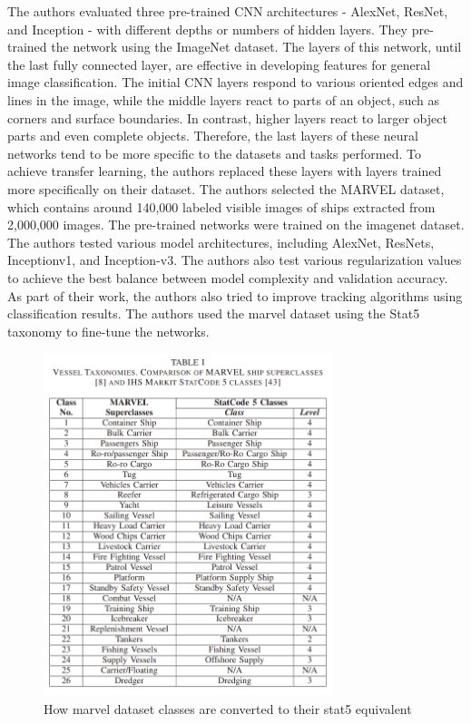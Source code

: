 The authors evaluated three pre-trained CNN architectures - AlexNet, ResNet, and Inception - with different depths or numbers of hidden layers. They pre-trained the network using the ImageNet dataset. The layers of this network, until the last fully connected layer, are effective in developing features for general image classification. The initial CNN layers respond to various oriented edges and lines in the image, while the middle layers react to parts of an object, such as corners and surface boundaries. In contrast, higher layers react to larger object parts and even complete objects. Therefore, the last layers of these neural networks tend to be more specific to the datasets and tasks performed. To achieve transfer learning, the authors replaced these layers with layers trained more specifically on their dataset. The authors selected the MARVEL dataset, which contains around 140,000 labeled visible images of ships extracted from 2,000,000 images. The pre-trained networks were trained on the imagenet dataset. The authors tested various model architectures, including AlexNet, ResNets, Inceptionv1, and Inception-v3. The authors also test various regularization values to achieve the best balance between model complexity and validation accuracy. As part of their work, the authors also tried to improve tracking algorithms using classification results. The authors used the marvel dataset using the Stat5 taxonomy to fine-tune the networks. 

\begin{figure}[H]
    \centering
    \includegraphics[width=\textwidth,height=10cm,keepaspectratio=true]{src/Images/stat5_taxonomy.png}
    \caption{How marvel dataset classes are converted to their stat5 equivalent\cite{leclerc2018ship}
     }
\end{figure}
\\

